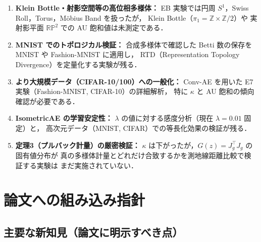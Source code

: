 \documentclass[12pt,a4paper]{ltjsarticle}  %
\begin{document}
\begin{enumerate}
  \item \textbf{Klein Bottle・射影空間等の高位相多様体：}
    EB 実験では円周 $S^1$，Swiss Roll，Torus，Möbius Band を扱ったが，
    Klein Bottle（$\pi_1 = \mathbb{Z} \times \mathbb{Z}/2$）や
    実射影平面 $\mathbb{RP}^2$ での AU 飽和値は未測定である．
  \item \textbf{MNIST でのトポロジカル検証：}
    合成多様体で確認した Betti 数の保存を MNIST や Fashion-MNIST に適用し，
    RTD（Representation Topology Divergence）を定量化する実験が残る．
  \item \textbf{より大規模データ（CIFAR-10/100）への一般化：}
    Conv-AE を用いた E7 実験（Fashion-MNIST, CIFAR-10）の詳細解析，
    特に $\kappa$ と AU 飽和の傾向確認が必要である．
  \item \textbf{IsometricAE の学習安定性：}
    $\lambda$ の値に対する感度分析（現在 $\lambda=0.01$ 固定）と，
    高次元データ（MNIST, CIFAR）での等長化効果の検証が残る．
  \item \textbf{定理3（プルバック計量）の厳密検証：}
    $\kappa$ は下がったが，$G(z) = J_g^\top J_g$ の固有値分布が
    真の多様体計量とどれだけ合致するかを測地線距離比較で検証する実験は
    まだ実施されていない．
\end{enumerate}

\section{論文への組み込み指針}

\subsection{主要な新知見（論文に明示すべき点）}
\end{document}
